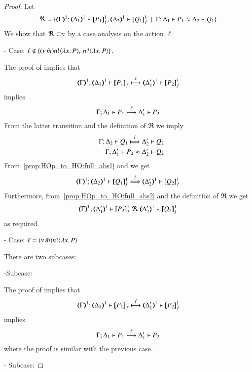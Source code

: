\begin{proof}

	\noi Let
%
	\[
		\Re = \set{\horel{\mapt{\Gamma}^{1}}{\mapt{\Delta_1}^{1}}{\pmapp{P_1}{1}{f}}{,}{\mapt{\Delta_2}^{1}}{\pmapp{Q_1}{1}{f}} \setbar \horel{\Gamma}{\Delta_1}{P_1}{\wb}{\Delta_2}{Q_1}}
	\]
%
	We show that $\Re \subset \approx$ by a case analysis on the action $\ell$

	\noi - Case: $\ell \notin \{(\nu\, \tilde{m}) n ! \langle \lambda x.\,P \rangle,\, n ? \langle \lambda x.\,P \rangle\}$.

	\noi The proof of  implies that
%
	\[
		\horel{\mapt{\Gamma}^{1}}{\mapt{\Delta_1}^{1}}{\pmapp{P_1}{1}{f}}{\hby{\ell}}{\mapt{\Delta_1'}^{1}}{\pmapp{P_2}{1}{f}}
	\]
%
	\noi implies
%
	\[
		\Gamma; \Delta_1 \vdash P_1 \stackrel{\ell}{\longmapsto} \Delta_1' \vdash P_2
	\]
%
	\noi From the latter transition and the definition of $\Re$ we imply
%
	\begin{eqnarray}
		&&\horel{\Gamma}{\Delta_2}{Q_1}{\Hby{\ell}}{\Delta_2'}{Q_2}
		\label{prop:HOp_to_HO:full_abs1}
		\\
		&&\horel{\Gamma}{\Delta_1'}{P_2}{\wb}{\Delta_2'}{Q_2}
		\label{prop:HOp_to_HO:full_abs2}
	\end{eqnarray}
%
	\noi From~\ref{prop:HOp_to_HO:full_abs1} and  we get
%
	\[
		\horel{\mapt{\Gamma}^{1}}{\mapt{\Delta_2}^{1}}{\pmapp{Q_1}{1}{f}}{\Hby{\ell}}{\mapt{\Delta_2'}^{1}}{\pmapp{Q_2}{1}{f}}
	\]
%
	\noi Furthermore, from~\ref{prop:HOp_to_HO:full_abs2} and the definition of $\Re$ we get
%
	\[
		\horel{\mapt{\Gamma}^{1}}{\mapt{\Delta_1'}^{1}}{\pmapp{P_2}{1}{f}}{\ \Re\ }{\mapt{\Delta_2'}^{1}}{\pmapp{Q_2}{1}{f}}
	\]
%
	\noi as required.

	\noi - Case: $\ell = (\nu\, \tilde{m}) n ! \langle \lambda x.\,P \rangle$

	\noi There are two subcases:

	\noi -Subcase:

	\noi The proof of  implies that
%
	\[
		\horel{\mapt{\Gamma}^{1}}{\mapt{\Delta_1}^{1}}{\pmapp{P_1}{1}{f}}{\hby{\ell}}{\mapt{\Delta_1'}^{1}}{\pmapp{P_2}{1}{f}}
	\]
%
	\noi implies
%
	\[
		\Gamma; \Delta_1 \vdash P_1 \stackrel{\ell}{\longmapsto} \Delta_1' \vdash P_2
	\]
%
	\noi where the proof is similar with the previous case.

	\noi - Subcase:


\end{proof}
